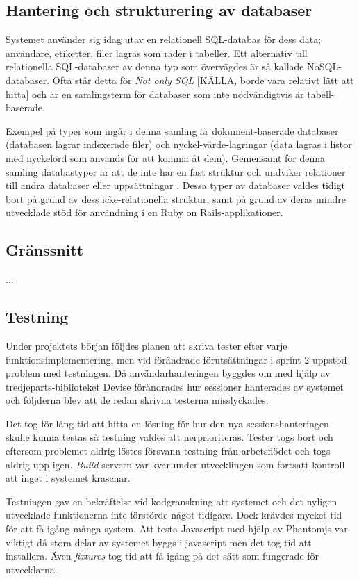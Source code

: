 \subsection{Hantering och strukturering av databaser}

Systemet använder sig idag utav en relationell SQL-databas för dess data; användare, etiketter, filer lagras som rader i tabeller. Ett alternativ till relationella SQL-databaser av denna typ som övervägdes är så kallade NoSQL-databaser. Ofta står detta för \emph{Not only SQL} [KÄLLA, borde vara relativt lätt att hitta] och är en samlingsterm för databaser som inte nödvändigtvis är tabell-baserade.

Exempel på typer som ingår i denna samling är dokument-baserade databaser (databasen lagrar indexerade filer) och nyckel-värde-lagringar (data lagras i listor med nyckelord som används för att komma åt dem). Gemensamt för denna samling databastyper är att de inte har en fast struktur och undviker relationer till andra databaser eller uppsättningar \cite{largedata}. Dessa typer av databaser valdes tidigt bort på grund av dess icke-relationella struktur, samt på grund av deras mindre utvecklade stöd för användning i en Ruby on Rails-applikationer.

\subsection{Gränssnitt}

...

\subsection{Testning}

Under projektets början följdes planen att skriva tester efter varje funktionsimplementering, men vid förändrade förutsättningar i sprint 2 uppstod problem med testningen. Då användarhanteringen byggdes om med hjälp av tredjeparts-biblioteket Devise förändrades hur sessioner hanterades av systemet och följderna blev att de redan skrivna testerna misslyckades.

Det tog för lång tid att hitta en lösning för hur den nya sessionshanteringen skulle kunna testas så testning valdes att nerprioriteras. Tester togs bort och eftersom problemet aldrig löstes försvann testning från arbetsflödet och togs aldrig upp igen. \emph{Build}-servern var kvar under utvecklingen som fortsatt kontroll att inget i systemet kraschar.

Testningen gav en bekräftelse vid kodgranskning att systemet och det nyligen utvecklade funktionerna inte förstörde något tidigare. Dock krävdes mycket tid för att få igång många system. Att testa Javascript med hjälp av Phantomjs var viktigt då stora delar av systemet byggs i javascript men det tog tid att installera. Även \emph{fixtures} tog tid att få igång på det sätt som fungerade för utvecklarna.

